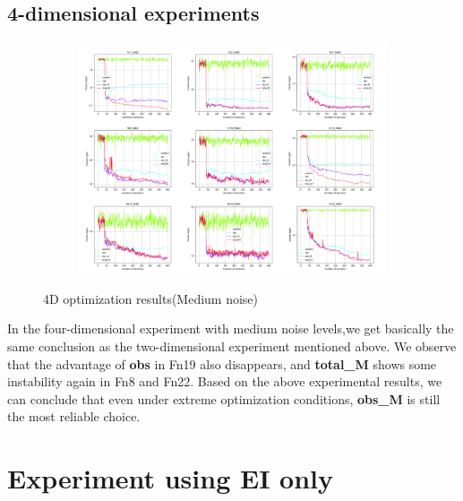 \documentclass{article}
\begin{document}
\subsection{4-dimensional experiments}

\begin{figure}[H]
    \centering
    \begin{subfigure}[t]{1\linewidth}
        \centering
        \includegraphics[width=.96\textwidth]{pictures/Homo_noise_4D/noise4D_M.png}
    \end{subfigure}
    \caption{4D optimization results(Medium noise)}
    \label{Fig8}
\end{figure}

\hspace{2em}In the four-dimensional experiment with medium noise levels,we get basically the same conclusion as the two-dimensional experiment mentioned above. We observe that the advantage of \textbf{obs} in Fn19 also disappears, and \textbf{total\_M} shows some instability again in Fn8 and Fn22. Based on the above experimental results, we can conclude that even under extreme optimization conditions, \textbf{obs\_M} is still the most reliable choice.

\section{Experiment using EI only}
\end{document}
